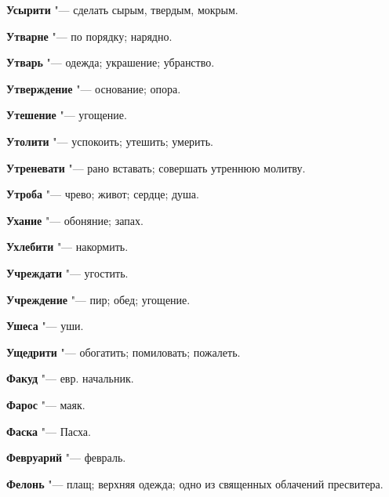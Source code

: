 \begin{mymulticols}{2}
\noindent\textbf{Усырити} "--- сделать сырым, твердым, мокрым. 




\noindent\textbf{Утварне} "--- по порядку; нарядно. 




\noindent\textbf{Утварь} "--- одежда; украшение; убранство. 




\noindent\textbf{Утверждение} "--- основание; опора. 




\noindent\textbf{Утешение} "--- угощение. 




\noindent\textbf{Утолити} "--- успокоить; утешить; умерить. 




\noindent\textbf{Утреневати} "--- рано вставать; совершать утреннюю молитву. 




\noindent\textbf{Утроба} "--- чрево; живот; сердце; душа. 




\noindent\textbf{Ухание} "--- обоняние; запах. 




\noindent\textbf{Ухлебити} "--- накормить. 




\noindent\textbf{Учреждати} "--- угостить. 




\noindent\textbf{Учреждение} "--- пир; обед; угощение. 




\noindent\textbf{Ушеса} "--- уши. 




\noindent\textbf{Ущедрити} "--- обогатить; помиловать; пожалеть. 









\noindent\textbf{Факуд} "--- евр. начальник. 




\noindent\textbf{Фарос} "--- маяк. 




\noindent\textbf{Фаска} "--- Пасха. 




\noindent\textbf{Февруарий} "--- февраль. 




\noindent\textbf{Фелонь} "--- плащ; верхняя одежда; одно из священных облачений пресвитера. 





\end{mymulticols}
